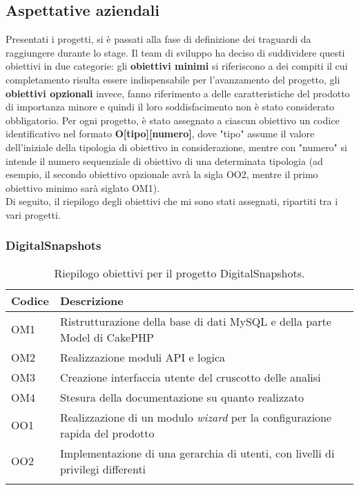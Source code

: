 \subsection{Aspettative aziendali}

Presentati i progetti, si è passati alla fase di definizione dei traguardi da raggiungere durante lo stage.
Il team di sviluppo ha deciso di suddividere questi obiettivi in due categorie: gli \textbf{obiettivi minimi} si riferiscono a dei compiti il cui completamento risulta essere indispensabile per l'avanzamento del progetto, gli \textbf{obiettivi opzionali} invece, fanno riferimento a delle caratteristiche del prodotto di importanza minore e quindi il loro soddisfacimento non è stato considerato obbligatorio.
Per ogni progetto, è stato assegnato a ciascun obiettivo un codice identificativo nel formato \textbf{O[tipo][numero]}, dove "tipo" assume il valore dell'iniziale della tipologia di obiettivo in considerazione, mentre con "numero" si intende il numero sequenziale di obiettivo di una determinata tipologia (ad esempio, il secondo obiettivo opzionale avrà la sigla OO2, mentre il primo obiettivo minimo sarà siglato OM1). \\
Di seguito, il riepilogo degli obiettivi che mi sono stati assegnati, ripartiti tra i vari progetti.

\subsubsection*{DigitalSnapshots}
\begin{center}
	\renewcommand{\arraystretch}{1.5}
	\begin{longtable}{ | p{0.1\linewidth} | p{0.9\linewidth} |}	 
		\hline   
	    \rowcolor{header}\textbf{Codice}&\textbf{Descrizione}\\
		\hline    	
    	OM1 & Ristrutturazione della base di dati MySQL e della parte Model di CakePHP \\
    	OM2 & Realizzazione moduli API e logica \\
    	OM3 & Creazione interfaccia utente del cruscotto delle analisi \\
    	OM4 & Stesura della documentazione su quanto realizzato \\
    	OO1 & Realizzazione di un modulo \textit{wizard} per la configurazione rapida del prodotto \\
    	OO2 & Implementazione di una gerarchia di utenti, con livelli di privilegi differenti \\
    	\hline
		\rowcolor{white}    	
    	\caption{Riepilogo obiettivi per il progetto DigitalSnapshots.}
	\end{longtable}
	\label{tab:obiettivi-digitalsnapshots}
\end{center}

